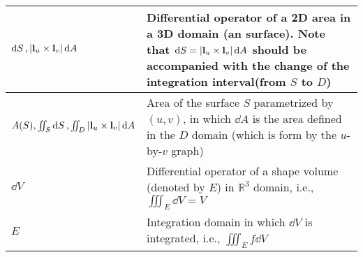 \begin{xltabular}{\textwidth}{XX}
	\(\dd{S}, \abs{\mathbf{l}_u\times\mathbf{l}_v} \dd{A} \)                                                                                                                                                                                                                                           & Differential operator of a 2D area in a 3D domain (an surface). Note that \(\dd{S} = \abs{\mathbf{l}_u\times\mathbf{l}_v} \dd{A}\) should be accompanied with the change of the integration interval(from \(S\) to \(D\))                                                                                                           \\ \hline
	\(A(S), \iint_S \dd{S}, \iint_D \abs{\mathbf{l}_u\times\mathbf{l}_v} \dd{A}\)                                                                                                                                                                                                                      & Area of the surface \(S\) parametrized by \((u,v)\), in which \(\dd{A}\) is the area defined in the \(D\) domain (which is form by the \(u\)-by-\(v\) graph)                                                                                                                                                                        \\ \hline
	\(\dd{V}\)                                                                                                                                                                                                                                                                                         & Differential operator of a shape volume (denoted by \(E\)) in \(\mathbb{R}^3\) domain, i.e., \(\iiint_E \dd{V} = V\)                                                                                                                                                                                                                \\ \hline
	\(E\)                                                                                                                                                                                                                                                                                              & Integration domain in which \(\dd{V}\) is integrated, i.e., \(\iiint_E f \dd{V}\) \cite{stewartCalculus2011}                                                                                                                                                                                                                        \\ \hline

\end{xltabular}
